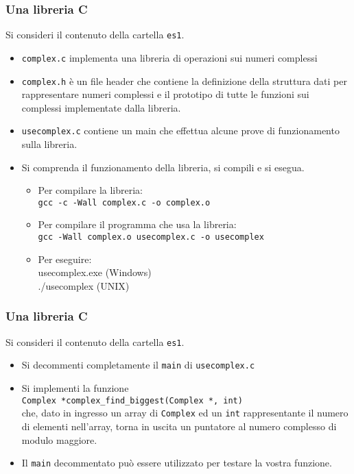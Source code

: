 \documentclass{beamer}
\begin{document}
\begin{frame}[fragile]
\frametitle{Una libreria C}
Si consideri il contenuto della cartella \texttt{es1}.
\begin{itemize}
 \item \texttt{complex.c} implementa una libreria di operazioni sui numeri complessi
 \item \texttt{complex.h} è un file header che contiene la definizione della struttura dati per rappresentare numeri complessi e il prototipo di tutte le funzioni sui complessi implementate dalla libreria.
 \item \texttt{usecomplex.c} contiene un main che effettua alcune prove di funzionamento sulla libreria.
 \item Si comprenda il funzionamento della libreria, si compili e si esegua.
 \begin{itemize}
  \item Per compilare la libreria: \\ \texttt{gcc -c -Wall complex.c -o complex.o}
  \item Per compilare il programma che usa la libreria:\\ \texttt{gcc -Wall complex.o usecomplex.c -o usecomplex}
  \item Per eseguire: \\ usecomplex.exe (Windows) \\ ./usecomplex (UNIX)
 \end{itemize}

\end{itemize}
\end{frame}

\begin{frame}[fragile]
\frametitle{Una libreria C}
Si consideri il contenuto della cartella \texttt{es1}.
\begin{itemize}
 \item Si decommenti completamente il \texttt{main} di \texttt{usecomplex.c}
 \item Si implementi la funzione\\ \texttt{Complex *complex\_find\_biggest(Complex *, int)}\\ che, dato in ingresso un array di \texttt{Complex} ed un \texttt{int} rappresentante il numero di elementi nell'array, torna in uscita un puntatore al numero complesso di modulo maggiore.
 \item Il \texttt{main} decommentato può essere utilizzato per testare la vostra funzione.
\end{itemize}
\end{frame}
\end{document}
